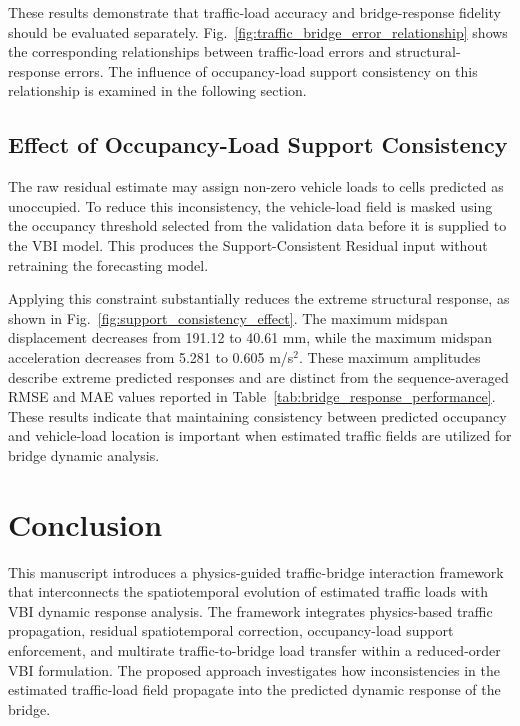 \documentclass[journal]{IEEEtran}
\begin{document}
These results demonstrate that traffic-load accuracy and bridge-response fidelity should be evaluated separately. Fig.~\ref{fig:traffic_bridge_error_relationship} shows the corresponding relationships between traffic-load errors and structural-response errors. The influence of occupancy-load support consistency on this relationship is examined in the following section.

\subsection{Effect of Occupancy-Load Support Consistency}
\label{sec:support_consistency_results}

The raw residual estimate may assign non-zero vehicle loads to cells predicted as unoccupied. To reduce this inconsistency, the vehicle-load field is masked using the occupancy threshold selected from the validation data before it is supplied to the VBI model. This produces the Support-Consistent Residual input without retraining the forecasting model.

Applying this constraint substantially reduces the extreme structural response, as shown in Fig.~\ref{fig:support_consistency_effect}. The maximum midspan displacement decreases from 191.12 to 40.61 mm, while the maximum midspan acceleration decreases from 5.281 to 0.605 m/s$^2$. These maximum amplitudes describe extreme predicted responses and are distinct from the sequence-averaged RMSE and MAE values reported in Table~\ref{tab:bridge_response_performance}. These results indicate that maintaining consistency between predicted occupancy and vehicle-load location is important when estimated traffic fields are utilized for bridge dynamic analysis.

\section{Conclusion}

This manuscript introduces a physics-guided traffic-bridge interaction framework that interconnects the spatiotemporal evolution of estimated traffic loads with VBI dynamic response analysis. The framework integrates physics-based traffic propagation, residual spatiotemporal correction, occupancy-load support enforcement, and multirate traffic-to-bridge load transfer within a reduced-order VBI formulation. The proposed approach investigates how inconsistencies in the estimated traffic-load field propagate into the predicted dynamic response of the bridge.
\end{document}
